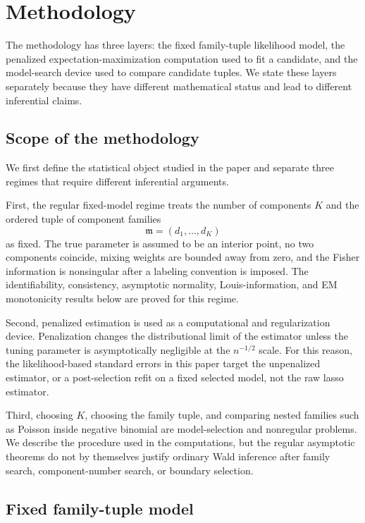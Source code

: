 \section{Methodology}
\label{sec:methodology}

The methodology has three layers: the fixed family-tuple likelihood model, the
penalized expectation-maximization computation used to fit a candidate, and the
model-search device used to compare candidate tuples.  We state these layers
separately because they have different mathematical status and lead to
different inferential claims.

\subsection{Scope of the methodology}

We first define the statistical object studied in the paper and separate three
regimes that require different inferential arguments.

First, the regular fixed-model regime treats the number of components \(K\) and
the ordered tuple of component families
\[
    \mathfrak m=(d_1,\ldots,d_K)
\]
as fixed.  The true parameter is assumed to be an interior point, no two
components coincide, mixing weights are bounded away from zero, and the Fisher
information is nonsingular after a labeling convention is imposed.  The
identifiability, consistency, asymptotic normality, Louis-information, and EM
monotonicity results below are proved for this regime.

Second, penalized estimation is used as a computational and regularization
device.  Penalization changes the distributional limit of the estimator unless
the tuning parameter is asymptotically negligible at the \(n^{-1/2}\) scale.
For this reason, the likelihood-based standard errors in this paper target the
unpenalized estimator, or a post-selection refit on a fixed selected model, not
the raw lasso estimator.

Third, choosing \(K\), choosing the family tuple, and comparing nested families
such as Poisson inside negative binomial are model-selection and nonregular
problems.  We describe the procedure used in the computations, but the regular
asymptotic theorems do not by themselves justify ordinary Wald inference after
family search, component-number search, or boundary selection.

\subsection{Fixed family-tuple model}

